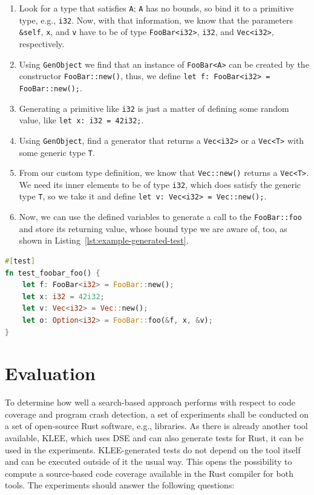 \documentclass{article}
\begin{document}
\begin{enumerate}
    \item Look for a type that satisfies \lstinline{A}; \lstinline{A} has no bounds, so bind it to a primitive type, e.g., \lstinline{i32}. Now, with that information, we know that the parameters \lstinline{&self}, \lstinline{x}, and \lstinline{v} have to be of type \lstinline{FooBar<i32>}, \lstinline{i32}, and \lstinline{Vec<i32>}, respectively.
    \item Using \lstinline{GenObject} we find that an instance of \lstinline{FooBar<A>} can be created by the constructor \lstinline{FooBar::new()}, thus, we define \lstinline{let f: FooBar<i32> = FooBar::new();}.
    \item Generating a primitive like \lstinline{i32} is just a matter of defining some random value, like \lstinline{let x: i32 = 42i32;}.
    \item Using \lstinline{GenObject}, find a generator that returns a \lstinline{Vec<i32>} or a \lstinline{Vec<T>} with some generic type \lstinline{T}.
    \item From our custom type definition, we know that \lstinline{Vec::new()} returns a \lstinline{Vec<T>}. We need its inner elements to be of type \lstinline{i32}, which does satisfy the generic type \lstinline{T}, so we take it and define \lstinline{let v: Vec<i32> = Vec::new();}.
    \item Now, we can use the defined variables to generate a call to the \lstinline{FooBar::foo} and store its returning value, whose bound type we are aware of, too, as shown in Listing~\ref{lst:example-generated-test}.
\end{enumerate}

\begin{lstlisting}[language=Rust, style=boxed, caption={An example test that invokes \lstinline{FooBar::foo}}, label=lst:example-generated-test]
#[test]
fn test_foobar_foo() {
    let f: FooBar<i32> = FooBar::new();
    let x: i32 = 42i32;
    let v: Vec<i32> = Vec::new();
    let o: Option<i32> = FooBar::foo(&f, x, &v);
}
\end{lstlisting}

\section{Evaluation}
To determine how well a search-based approach performs with respect to code coverage and program crash detection, a set of experiments shall be conducted on a set of open-source Rust software, e.g., libraries. As there is already another tool available, KLEE, which uses \ac{DSE} and can also generate tests for Rust, it can be used in the experiments. KLEE-generated tests do not depend on the tool itself and can be executed outside of it the usual way. This opens the possibility to compute a source-based code coverage available in the Rust compiler for both tools. The experiments should answer the following questions:
\end{document}
